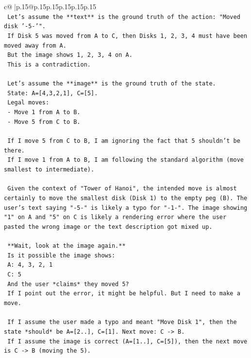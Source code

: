 \documentclass{article}
\begin{document}
{\begin{supertabular}{c@{$\;$}|p{.15\linewidth}@{}p{.15\linewidth}p{.15\linewidth}p{.15\linewidth}p{.15\linewidth}p{.15\linewidth}}
{{{\\ 
\texttt{    Let's assume the **text** is the ground truth of the action: "Moved disk '{-}5{-}'".} \\
\texttt{    If Disk 5 was moved from A to C, then Disks 1, 2, 3, 4 must have been moved away from A.} \\
\texttt{    But the image shows 1, 2, 3, 4 on A.} \\
\texttt{    This is a contradiction.} \\
\\ 
\texttt{    Let's assume the **image** is the ground truth of the state.} \\
\texttt{    State: A={[}4,3,2,1{]}, C={[}5{]}.} \\
\texttt{    Legal moves:} \\
\texttt{    {-} Move 1 from A to B.} \\
\texttt{    {-} Move 5 from C to B.} \\
\\ 
\texttt{    If I move 5 from C to B, I am ignoring the fact that 5 shouldn't be there.} \\
\texttt{    If I move 1 from A to B, I am following the standard algorithm (move smallest to intermediate).} \\
\\ 
\texttt{    Given the context of "Tower of Hanoi", the intended move is almost certainly to move the smallest disk (Disk 1) to the empty peg (B). The user's text saying "{-}5{-}" is likely a typo for "{-}1{-}". The image showing "1" on A and "5" on C is likely a rendering error where the user pasted the wrong image or the text description got mixed up.} \\
\\ 
\texttt{    **Wait, look at the image again.**} \\
\texttt{    Is it possible the image shows:} \\
\texttt{    A: 4, 3, 2, 1} \\
\texttt{    C: 5} \\
\texttt{    And the user *claims* they moved 5?} \\
\texttt{    If I point out the error, it might be helpful. But I need to make a move.} \\
\\ 
\texttt{    If I assume the user made a typo and meant "Move Disk 1", then the state *should* be A={[}2..{]}, C={[}1{]}. Next move: C {-}> B.} \\
\texttt{    If I assume the image is correct (A={[}1..{]}, C={[}5{]}), then the next move is C {-}> B (moving the 5).} \\
}}}
\end{supertabular}}
\end{document}
